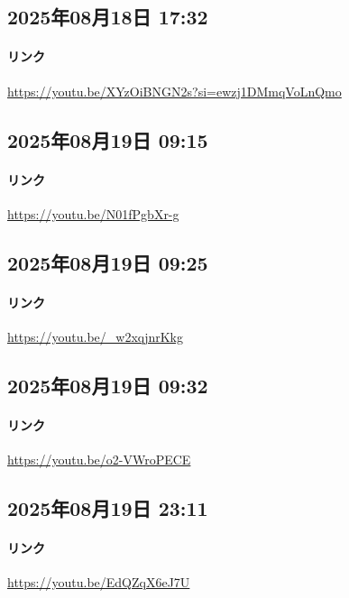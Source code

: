 \subsection*{2025年08月18日 17:32}

\paragraph{リンク}
\url{https://youtu.be/XYzOiBNGN2s?si=ewzj1DMmqVoLnQmo}

\subsection*{2025年08月19日 09:15}

\paragraph{リンク}
\url{https://youtu.be/N01fPgbXr-g}

\subsection*{2025年08月19日 09:25}

\paragraph{リンク}
\url{https://youtu.be/_w2xqjnrKkg}

\subsection*{2025年08月19日 09:32}

\paragraph{リンク}
\url{https://youtu.be/o2-VWroPECE}

\subsection*{2025年08月19日 23:11}

\paragraph{リンク}
\url{https://youtu.be/EdQZqX6eJ7U}

